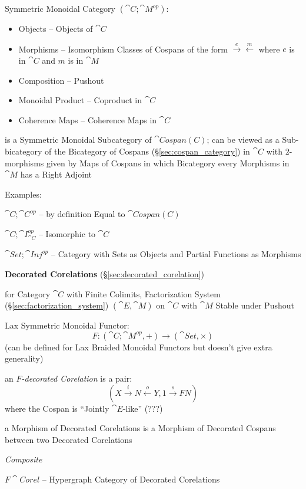 Symmetric Monoidal Category $(\cat{C}; \cat{M}^{op})$:
\begin{itemize}
  \item Objects -- Objects of $\cat{C}$
  \item Morphisms -- Isomorphism Classes of Cospans of the form
    $\xrightarrow{e}\xleftarrow{m}$ where $e$ is in $\cat{C}$ and $m$
    is in $\cat{M}$
  \item Composition -- Pushout
  \item Monoidal Product -- Coproduct in $\cat{C}$
  \item Coherence Maps -- Coherence Maps in $\cat{C}$
\end{itemize}
is a Symmetric Monoidal Subcategory of $\cat{Cospan(C)}$; can be
viewed as a Sub-bicategory of the Bicategory of Cospans
(\S\ref{sec:cospan_category}) in $\cat{C}$ with $2$-morphisms given by
Maps of Cospans in which Bicategory every Morphisms in $\cat{M}$ has a
Right Adjoint


Examples:

$\cat{C};\cat{C}^{op}$ -- by definition Equal to $\cat{Cospan(C)}$

$\cat{C};\cat{I}_{\cat{C}}^{op}$ -- Isomorphic to $\cat{C}$

$\cat{Set};\cat{Inj}^{op}$ -- Category with Sets as Objects and
Partial Functions as Morphisms


\textbf{Decorated Corelations} (\S\ref{sec:decorated_corelation})

for Category $\cat{C}$ with Finite Colimits, Factorization System
(\S\ref{sec:factorization_system}) $(\cat{E},\cat{M})$ on $\cat{C}$
with $\cat{M}$ Stable under Pushout

Lax Symmetric Monoidal Functor:
\[
  F : (\cat{C};\cat{M}^{op}, +) \rightarrow (\cat{Set}, \times)
\]
(can be defined for Lax Braided Monoidal Functors but doesn't give
extra generality)

an \emph{$F$-decorated Corelation} is a pair:
\[
  (X \xrightarrow{i} N \xleftarrow{o} Y, 1 \xrightarrow{s} F N)
\]
where the Cospan is ``Jointly $\cat{E}$-like'' (???) %

a Morphism of Decorated Corelations is a Morphism of Decorated Cospans
between two Decorated Corelations


\emph{Composite} %


\asterism


$F\cat{Corel}$ -- Hypergraph Category of Decorated Corelations

